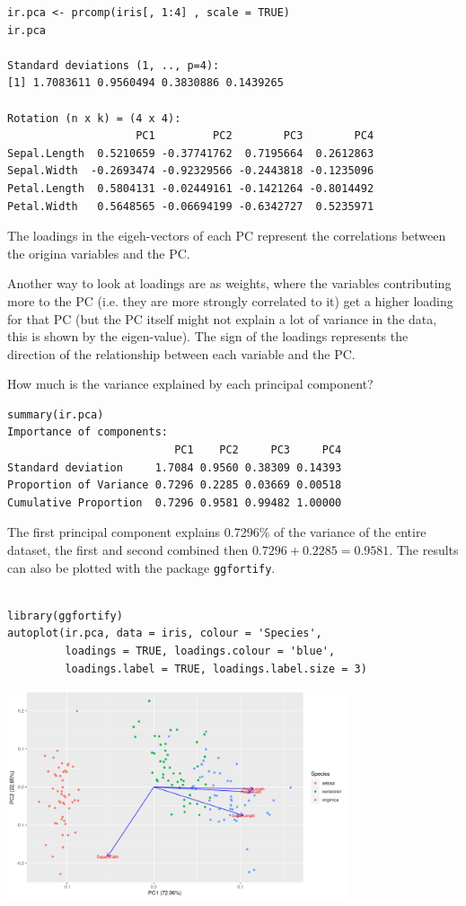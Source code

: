 \documentclass{article}
\begin{document}
\begin{lstlisting}
ir.pca <- prcomp(iris[, 1:4] , scale = TRUE)
ir.pca

Standard deviations (1, .., p=4):
[1] 1.7083611 0.9560494 0.3830886 0.1439265

Rotation (n x k) = (4 x 4):
                    PC1         PC2        PC3        PC4
Sepal.Length  0.5210659 -0.37741762  0.7195664  0.2612863
Sepal.Width  -0.2693474 -0.92329566 -0.2443818 -0.1235096
Petal.Length  0.5804131 -0.02449161 -0.1421264 -0.8014492
Petal.Width   0.5648565 -0.06694199 -0.6342727  0.5235971
\end{lstlisting}

The loadings in the eigeh-vectors of each PC represent the correlations between the origina variables and the PC. \par 
Another way to look at loadings are as weights, where the variables contributing more to the PC (i.e. they are more strongly correlated to it) get a higher loading for that PC (but the PC itself might not explain a lot of variance in the data, this is shown by the eigen-value). The sign of the loadings represents the direction of the relationship between each variable and the PC.\par 
How much is the variance explained by each principal component?
\begin{lstlisting}
summary(ir.pca)
Importance of components:
                          PC1    PC2     PC3     PC4
Standard deviation     1.7084 0.9560 0.38309 0.14393
Proportion of Variance 0.7296 0.2285 0.03669 0.00518
Cumulative Proportion  0.7296 0.9581 0.99482 1.00000
\end{lstlisting}

The first principal component explains 0.7296\% of the variance of the entire dataset, the first and second combined then $0.7296+0.2285=0.9581$. The results can also be plotted with the package \texttt{ggfortify}.

\begin{lstlisting}

library(ggfortify)
autoplot(ir.pca, data = iris, colour = 'Species',
         loadings = TRUE, loadings.colour = 'blue',
         loadings.label = TRUE, loadings.label.size = 3)
\end{lstlisting}

\begin{center}
    \includegraphics[width = 0.75\textwidth]{lab4/iris-pcs.png}
\end{center}
\end{document}
